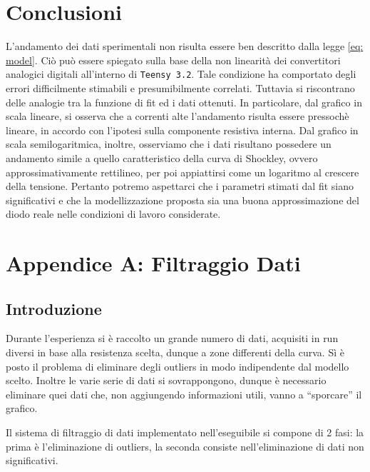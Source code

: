 \documentclass{article}[a4paper, oneside, 11pt]
\begin{document}
\section{Conclusioni}
L'andamento dei dati sperimentali non risulta essere ben descritto dalla legge
\eqref{eq: model}. Ciò può essere spiegato sulla base della non linearità dei
convertitori analogici digitali all'interno di \verb+Teensy 3.2+. Tale 
condizione ha comportato degli errori difficilmente stimabili e presumibilmente
correlati. Tuttavia si riscontrano delle analogie tra la funzione di fit ed i
dati ottenuti. In particolare, dal grafico in scala lineare, si osserva che
a correnti alte l'andamento risulta essere pressoch\`e lineare, in accordo con
l'ipotesi sulla componente resistiva interna. Dal grafico in scala
semilogaritmica, inoltre, osserviamo che i dati risultano possedere un
andamento simile a quello caratteristico della curva di Shockley, ovvero
approssimativamente rettilineo, per poi appiattirsi come un logaritmo al
crescere della tensione.
Pertanto potremo aspettarci che i parametri stimati dal fit siano significativi 
e che la modellizzazione proposta sia una buona approssimazione del diodo reale 
nelle condizioni di lavoro considerate.

\section{Appendice A: Filtraggio Dati}\label{app: A}

\subsection{Introduzione}
Durante l’esperienza si è raccolto un grande numero di dati, acquisiti in
run diversi in base alla resistenza scelta, dunque a zone differenti della
curva. Sì è posto il problema di eliminare degli outliers in modo
indipendente dal modello scelto. Inoltre le varie serie di dati si
sovrappongono, dunque è necessario eliminare quei dati che, non aggiungendo
informazioni utili, vanno a “sporcare” il grafico.

Il sistema di filtraggio di dati implementato nell'eseguibile si compone di 2
fasi: la prima è l’eliminazione di outliers, la seconda consiste
nell'eliminazione di dati non significativi.
\end{document}

